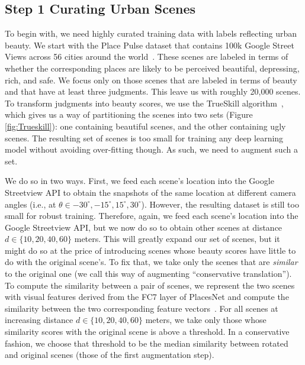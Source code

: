 \subsection*{Step 1 Curating Urban Scenes}
\label{Sec:dataset}
To begin with, we need highly curated training data with labels reflecting urban beauty. We start with the  Place Pulse dataset that contains 100k Google Street Views across 56 cities around the world~\cite{dubey2016deep}. These scenes are labeled in terms of whether the corresponding places are likely to be perceived beautiful, depressing, rich, and safe. We focus only on those scenes that are labeled in terms of beauty and that have at least three judgments. This leave us with roughly  20,000 scenes. To transform judgments into beauty scores, we use the TrueSkill algorithm~\cite{herbrich2007trueskill}, which gives us a way of partitioning the scenes into two sets (Figure \ref{fig:Trueskill}): one containing beautiful scenes, and the other containing ugly scenes. The resulting set of scenes is too small for training any deep learning model without avoiding over-fitting though. As such, we need to augment such a set. 

We do so in two ways. First, we feed each scene's location into the Google Streetview API to obtain  the snapshots of the same location at different camera angles (i.e., at $\theta \in {-30^{\circ}, -15^{\circ} , 15^{\circ} , 30^{\circ} }$). However, the resulting dataset is still too small for robust training. Therefore, again, we feed each scene's location into the Google Streetview API, but we now do so to obtain other scenes at  distance $d \in \{10,20,40,60\}$ meters.  This will greatly expand our set of scenes, but it might do so at the price of introducing scenes whose beauty scores have little to do with the original scene's. To fix that, we take only the scenes that are \emph{similar} to the original one (we call this way of augmenting ``conservative translation''). To compute the similarity between a pair of scenes, we represent the two scenes with visual features derived from the FC7 layer of PlacesNet and compute the similarity between the two corresponding feature vectors~\cite{zhou2014learning}. For all scenes at increasing distance $d \in \{10,20,40,60\}$ meters,  we take only those whose similarity scores with the original scene is above a threshold. In a conservative fashion, we choose that threshold to be the median similarity between rotated and original scenes (those of the first augmentation step). 

